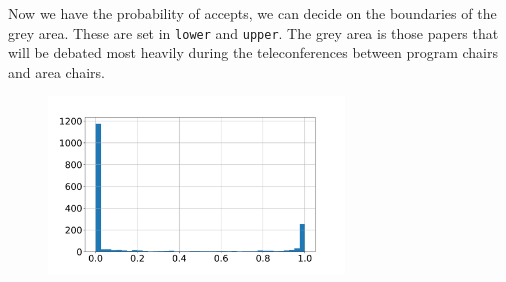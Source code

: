 Now we have the probability of accepts, we can decide on the boundaries
of the grey area. These are set in \texttt{lower} and \texttt{upper}.
The grey area is those papers that will be debated most heavily during
the teleconferences between program chairs and area chairs.

\begin{Shaded}
\begin{Highlighting}[]
\OperatorTok{=}
\OperatorTok{=}
\OperatorTok{=}\OperatorTok{\textgreater{}}\OperatorTok{\&}\OperatorTok{\textless{}}
\NormalTok{(}\NormalTok{())}
\end{Highlighting}
\end{Shaded}

\begin{Shaded}
\begin{Highlighting}[]
\end{Highlighting}
\end{Shaded}

\begin{Shaded}
\begin{Highlighting}[]
\OperatorTok{=}\OperatorTok{=}
\NormalTok{(}\NormalTok{())}
\NormalTok{\_ }\OperatorTok{=}\OperatorTok{=}\OperatorTok{=}
\OperatorTok{=}\OperatorTok{=}\NormalTok{)}
\end{Highlighting}
\end{Shaded}

\begin{figure}[htb]
\includegraphics[width=0.70\textwidth]{diagrams/neurips/probability-of-accept.pdf}


\caption{}
\label{probability-of-accept}
\end{figure}


